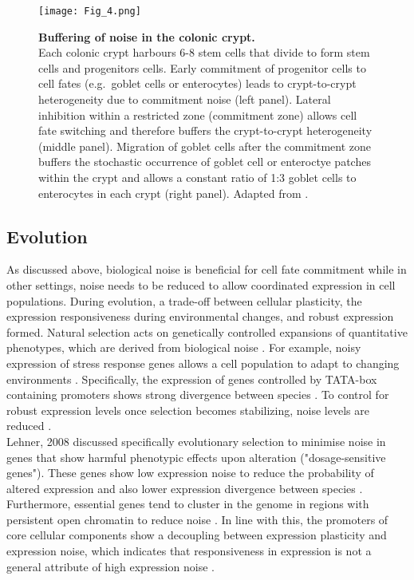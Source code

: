 \begin{figure}[!h]
\centering
\texttt{[image: Fig\_4.png]}
\caption[Buffering of noise in the colonic crypt]{\textbf{Buffering of noise in the colonic crypt.}\\
Each colonic crypt harbours 6-8 stem cells that divide to form stem cells and progenitors cells. Early commitment of progenitor cells to cell fates (e.g.~goblet cells or enterocytes) leads to crypt-to-crypt heterogeneity due to commitment noise (left panel). Lateral inhibition within a restricted zone (commitment zone) allows cell fate switching and therefore buffers the crypt-to-crypt heterogeneity (middle panel). Migration of goblet cells after the commitment zone buffers the stochastic occurrence of goblet cell or enteroctye patches within the crypt and allows a constant ratio of 1:3 goblet cells to enterocytes in each crypt (right panel). Adapted from \citep{Toth2017}.}
\label{fig0:noise_tissue}
\end{figure}

\subsection{Evolution}

As discussed above, biological noise is beneficial for cell fate commitment while in other settings, noise needs to be reduced to allow coordinated expression in cell populations. During evolution, a trade-off between cellular plasticity, the expression responsiveness during environmental changes, and robust expression formed. Natural selection acts on genetically controlled expansions of quantitative phenotypes, which are derived from biological noise \citep{Eldar2010}. For example, noisy expression of stress response genes allows a cell population to adapt to changing environments \citep{Lopez-Maury2009}. Specifically, the expression of genes controlled by TATA-box containing promoters shows strong divergence between species \citep{Tirosh2006}. To control for robust expression levels once selection becomes stabilizing, noise levels are reduced \citep{Lopez-Maury2009, Eldar2010, Pires2016}. \\

Lehner, 2008 discussed specifically evolutionary selection to minimise noise in genes that show harmful phenotypic effects upon alteration ("dosage-sensitive genes"). These genes show low expression noise to reduce the probability of altered expression and also lower expression divergence between species \citep{Lehner2008}. Furthermore, essential genes tend to cluster in the genome in regions with persistent open chromatin to reduce noise \citep{Batada2007}. In line with this, the promoters of core cellular components show a decoupling between expression plasticity and expression noise, which indicates that responsiveness in expression is not a general attribute of high expression noise \citep{Lehner2010a}. \\

